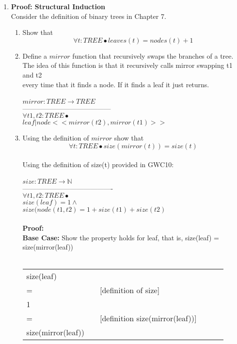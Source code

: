 \documentclass{article}
\begin{document}
\begin{enumerate}[\bf I.]
\item \textbf{Proof: Structural Induction} \\[8pt]
Consider the definition of binary trees in Chapter 7.
\begin{enumerate}
\item Show that
\[\forall t: TREE \bullet leaves(t) = nodes(t) + 1\]
\item Define a $mirror$ function that recursively swaps the branches of a tree. \\
  The idea of this function is that it recursively calls mirror swapping t1 and t2 \\
  every time that it finds a node. If it finds a leaf it just returns. \\
  \\
  $ mirror: TREE \rightarrow TREE $\\
  --------------------------------------- \\
  $\forall t1,t2 : TREE \bullet$\\
  $leaf | node <<mirror(t2),mirror(t1)>>$ \\
\item Using the definition of $mirror$  show
that
\[\forall t: TREE \bullet size(mirror(t)) = size(t)\] \\
Using the definition of size(t) provided in GWC10: \\
\\
$ size: TREE \rightarrow \mathbb{N} $\\
---------------------------------------- \\
$ \forall t1,t2: TREE \bullet $\\
$ size (leaf) = 1 \land $\\
$ size (node(t1,t2) = 1 + size(t1) + size(t2) $ \\
\\
\textbf{Proof:}\\
\textbf{Base Case:} Show the property holds for leaf, that is, size(leaf) = size(mirror(leaf)) \\
\\
\begin{tabular}{l ll lll}
     size(leaf) &    &  \\
     = &   & [definition of size] \\
     1 & & \\
     = &   & [definition size(mirror(leaf))] \\
     size(mirror(leaf)) & &  \\
\end{tabular} \\

\end{enumerate}
\end{enumerate}
\end{document}
